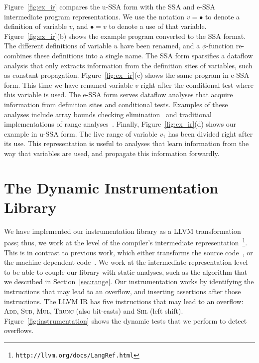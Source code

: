 \documentclass[preprint]{sigplanconf}[10pt]
\begin{document}
Figure~\ref{fig:ex_ir} compares the u-SSA form with the SSA and e-SSA
intermediate program representations.
We use the notation $v = \bullet$ to denote a definition of variable $v$, and
$\bullet = v$ to denote a use of that variable.
Figure~\ref{fig:ex_ir}(b) shows the example program converted to the SSA format.
The different definitions of variable $u$ have been renamed, and a
$\phi$-function re-combines these definitions into a single name.
The SSA form sparsifies a dataflow analysis that only extracts information from
the definition sites of variables, such as constant propagation.
Figure~\ref{fig:ex_ir}(c) shows the same program in e-SSA form.
This time we have renamed variable $v$ right after the conditional test where
this variable is used.
The e-SSA form serves dataflow analyses that acquire information from definition
sites and conditional tests.
Examples of these analyses include array bounds checking
elimination~\cite{Bodik00} and traditional implementations of range
analyses~\cite{Gough94,Patterson95}.
Finally, Figure~\ref{fig:ex_ir}(d) shows our example in u-SSA form.
The live range of variable $v_1$ has been divided right after its use.
This representation is useful to analyses that learn information from the way
that variables are used, and propagate this information forwardly.

\section{The Dynamic Instrumentation Library}
\label{sec:dyn}

We have implemented our instrumentation library as a LLVM transformation pass;
thus, we work at the level of the compiler's intermediate
representation~\footnote{\texttt{http://llvm.org/docs/LangRef.html}}.
This is in contrast to previous work, which either transforms the
source code~\cite{Dietz12}, or the machine dependent code~\cite{Brumley07}.
We work at the intermediate representation level to be able to couple our
library with static analyses, such as the algorithm that we described in
Section~\ref{sec:range}.
Our instrumentation works by identifying the instructions that may 
lead to an overflow, and inserting assertions after those instructions. 
The LLVM IR has five instructions that may lead to an overflow:
\textsc{Add}, \textsc{Sub}, \textsc{Mul},  \textsc{Trunc} (also bit-casts) and
\textsc{Shl} (left shift).
Figure~\ref{fig:instrumentation} shows the dynamic tests that we perform to
detect overflows.
\end{document}
